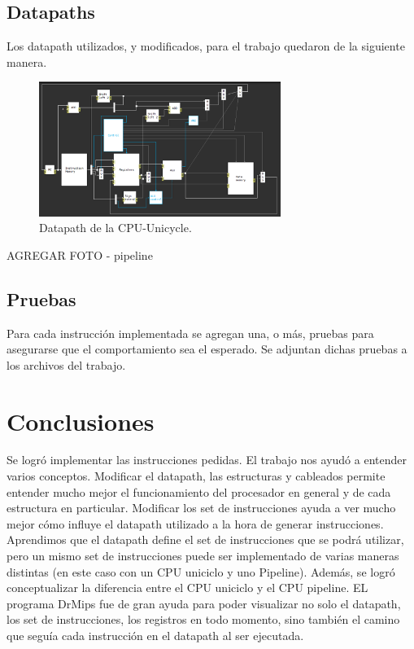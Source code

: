 \documentclass[a4paper, 12pt]{article}
\begin{document}
	
	\subsection{Datapaths}
	Los datapath utilizados, y modificados, para el trabajo quedaron de la siguiente manera.
	
	\begin{figure}[h]
  		\centering
		    \includegraphics[width=0.7\textwidth]{files/cpuunicycle.png}
	 	 \caption{Datapath de la CPU-Unicycle.}
  		\label{fig:ejemplo}
	\end{figure}

	AGREGAR FOTO - pipeline
	\subsection{Pruebas}
	Para cada instrucción implementada se agregan una, o más, pruebas para asegurarse que el comportamiento sea el esperado. Se adjuntan dichas pruebas a los archivos del trabajo.
	
	
	\section{Conclusiones}
	Se logró implementar las instrucciones pedidas.
	El trabajo nos ayudó a entender varios conceptos. Modificar el datapath, las estructuras y cableados permite entender mucho mejor el funcionamiento del procesador en general y de cada estructura en particular. Modificar los set de instrucciones ayuda a ver mucho mejor cómo influye el datapath utilizado a la hora de generar instrucciones. Aprendimos que el datapath define el set de instrucciones que se podrá utilizar, pero un mismo set de instrucciones puede ser implementado de varias maneras distintas (en este caso con un CPU uniciclo y uno Pipeline). Además, se logró conceptualizar la diferencia entre el CPU uniciclo y el CPU pipeline.
	EL programa DrMips fue de gran ayuda para poder visualizar no solo el datapath, los set de instrucciones, los registros en todo momento, sino también el camino que seguía cada instrucción en el datapath al ser ejecutada.
\end{document}
